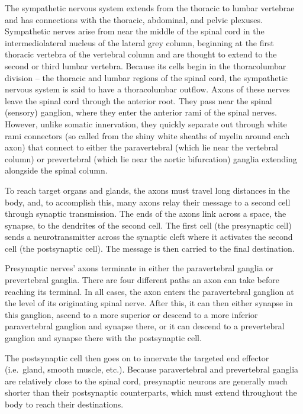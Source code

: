 \documentclass[]{book}
\begin{document}
The sympathetic nervous system extends from the thoracic to lumbar vertebrae and has connections with the thoracic, abdominal, and pelvic plexuses.
Sympathetic nerves arise from near the middle of the spinal cord in the intermediolateral nucleus of the lateral grey column, beginning at the first thoracic vertebra of the vertebral column and are thought to extend to the second or third lumbar vertebra. Because its cells begin in the thoracolumbar division -- the thoracic and lumbar regions of the spinal cord, the sympathetic nervous system is said to have a thoracolumbar outflow. Axons of these nerves leave the spinal cord through the anterior root. They pass near the spinal (sensory) ganglion, where they enter the anterior rami of the spinal nerves. However, unlike somatic innervation, they quickly separate out through white rami connectors (so called from the shiny white sheaths of myelin around each axon) that connect to either the paravertebral (which lie near the vertebral column) or prevertebral (which lie near the aortic bifurcation) ganglia extending alongside the spinal column.

To reach target organs and glands, the axons must travel long distances in the body, and, to accomplish this, many axons relay their message to a second cell through synaptic transmission. The ends of the axons link across a space, the synapse, to the dendrites of the second cell. The first cell (the presynaptic cell) sends a neurotransmitter across the synaptic cleft where it activates the second cell (the postsynaptic cell). The message is then carried to the final destination.

Presynaptic nerves' axons terminate in either the paravertebral ganglia or prevertebral ganglia. There are four different paths an axon can take before reaching its terminal. In all cases, the axon enters the paravertebral ganglion at the level of its originating spinal nerve. After this, it can then either synapse in this ganglion, ascend to a more superior or descend to a more inferior paravertebral ganglion and synapse there, or it can descend to a prevertebral ganglion and synapse there with the postsynaptic cell.

The postsynaptic cell then goes on to innervate the targeted end effector (i.e.~gland, smooth muscle, etc.). Because paravertebral and prevertebral ganglia are relatively close to the spinal cord, presynaptic neurons are generally much shorter than their postsynaptic counterparts, which must extend throughout the body to reach their destinations.
\end{document}
